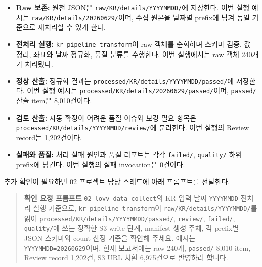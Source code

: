 \documentclass[12pt,a4paper]{article}
\newcommand{\DocNeedspace}[1]{\par\ifdim\dimexpr\pagegoal-\pagetotal\relax<#1\newpage\fi}
\begin{document}
\DocNeedspace{5\baselineskip}
\begin{itemize}[leftmargin=1.35em, itemsep=5pt, topsep=3pt]
\item \textbf{Raw 보존:} 원천 JSON은 \texttt{raw/\allowbreak{}KR/\allowbreak{}details/\allowbreak{}YYYYMMDD/\allowbreak{}}에 저장한다. 이번 실행 예시는 \texttt{raw/\allowbreak{}KR/\allowbreak{}details/\allowbreak{}20260629/\allowbreak{}}이며, 수집 원본을 날짜별 prefix에 남겨 동일 기준으로 재처리할 수 있게 한다.
\item \textbf{전처리 실행:} \texttt{kr-\allowbreak{}pipeline-\allowbreak{}transform}이 raw 객체를 순회하며 스키마 검증, 값 정리, 좌표와 날짜 정규화, 품질 분류를 수행한다. 이번 실행에서는 raw 객체 240개가 처리됐다.
\item \textbf{정상 산출:} 정규화 결과는 \texttt{processed/\allowbreak{}KR/\allowbreak{}details/\allowbreak{}YYYYMMDD/\allowbreak{}passed/\allowbreak{}}에 저장한다. 이번 실행 예시는 \texttt{processed/\allowbreak{}KR/\allowbreak{}details/\allowbreak{}20260629/\allowbreak{}passed/\allowbreak{}}이며, \texttt{passed/\allowbreak{}} 산출 item은 8,010건이다.
\item \textbf{검토 산출:} 자동 확정이 어려운 품질 이슈와 보강 필요 항목은 \texttt{processed/\allowbreak{}KR/\allowbreak{}details/\allowbreak{}YYYYMMDD/\allowbreak{}review/\allowbreak{}}에 분리한다. 이번 실행의 Review record는 1,202건이다.
\DocNeedspace{5\baselineskip}
\item \textbf{실패와 품질:} 처리 실패 원인과 품질 리포트는 각각 \texttt{failed/\allowbreak{}}, \texttt{quality/\allowbreak{}} 하위 prefix에 남긴다. 이번 실행의 실패 invocation은 0건이다.
\end{itemize}

\DocNeedspace{8\baselineskip}
추가 확인이 필요하면 02 프로젝트 담당 스레드에 아래 프롬프트를 전달한다.

\begin{quote}
\footnotesize
\textbf{확인 요청 프롬프트}\quad
\texttt{02\_\allowbreak{}lovv\_\allowbreak{}data\_\allowbreak{}collect}의 KR 입력 날짜 \texttt{YYYYMMDD} 전처리 실행 기준으로, \texttt{kr-\allowbreak{}pipeline-\allowbreak{}transform}이 \texttt{raw/\allowbreak{}KR/\allowbreak{}details/\allowbreak{}YYYYMMDD/\allowbreak{}}를 읽어 \texttt{processed/\allowbreak{}KR/\allowbreak{}details/\allowbreak{}YYYYMMDD/\allowbreak{}passed/\allowbreak{}}, \texttt{review/\allowbreak{}}, \texttt{failed/\allowbreak{}}, \texttt{quality/\allowbreak{}}에 쓰는 정확한 S3 write 단계, manifest 생성 주체, 각 prefix별 JSON 스키마와 count 산정 기준을 확인해 주세요. 예시는 \texttt{YYYYMMDD=20260629}이며, 현재 보고서에는 raw 240개, \texttt{passed/\allowbreak{}} 8,010 item, Review record 1,202건, S3 URL 치환 6,975건으로 반영하려 합니다.
\end{quote}
\end{document}
